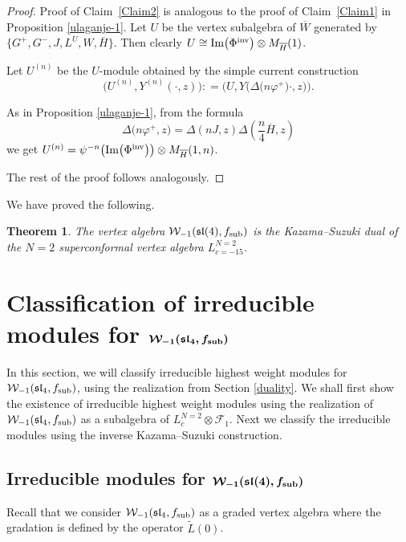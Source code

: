 \documentclass[pdftex]{sigma}
\numberwithin{equation}{section}
\newcommand{\F}{\mathcal F}
\newtheorem{Theorem}{Theorem}[section]
\begin{document}
\begin{proof}
Proof of Claim~\ref{Claim2} is analogous to the proof of Claim~\ref{Claim1} in Proposition \ref{ulaganje-1}. Let $U$ be the vertex subalgebra of $\overline W$ generated by $\big\{ G^+, G^-, J, L^U, W, \overline{H} \big\}$. Then clearly $U \cong \operatorname{Im} \bigl(\Phi^{\rm inv}\bigr) \otimes M_{\overline{H}} (1)$.

Let $ U^{(n)} $ be the $U$-module obtained by the simple current construction
\[ \bigl(U^{(n)}, Y^{(n)} (\cdot, z)\bigr): = \bigl(U , Y\bigl(\Delta\bigl(n \varphi^+\bigr) \cdot, z\bigr)\bigr).
\]

As in Proposition \ref{ulaganje-1}, from the formula
\[%
\Delta\bigl(n\varphi^+, z\bigr) = \Delta( nJ, z) \Delta\left(\frac{n}{4} \overline{H}, z\right)
\]
we get
$U^{(n)}= \psi^{-n}\bigl( \operatorname{Im} \bigl(\Phi^{\rm inv}\bigr)\bigr) \otimes M_{\overline{H}} (1,n )$.


The rest of the proof follows analogously.
\end{proof}

We have proved the following.

\begin{Theorem} The vertex algebra $\mathcal{W}_{-1}(\mathfrak{sl}(4), f_{\rm sub})$ is the Kazama--Suzuki dual of the $N=2$ superconformal vertex algebra $L^{N=2}_{c=-15}$.
\end{Theorem}

\section[Classification of irreducible modules for W\_-1(sl\_4, f\_sub]{Classification of irreducible modules for $\boldsymbol{\mathcal{W}_{-1}(\mathfrak{sl}_4, f_{\rm sub})}$}

 In this section, we will classify irreducible highest weight modules for $\mathcal{W}_{-1}(\mathfrak{sl}_4, f_{\rm sub})$, using the realization from Section \ref{duality}.
 We shall first show the existence of irreducible highest weight modules using the realization of $\mathcal{W}_{-1}(\mathfrak{sl}_4, f_{\rm sub})$ as a subalgebra of $L_c ^{N=2} \otimes \F_1$. Next we classify the irreducible modules using the inverse Kazama--Suzuki construction.

\subsection[Irreducible modules for W\_-1(sl(4), f\_sub]{Irreducible modules for $\boldsymbol{\mathcal{W}_{-1}(\mathfrak{sl}(4), f_{\rm sub})}$}
Recall that we consider $\mathcal{W}_{-1}(\mathfrak{sl}_4, f_{\rm sub})$ as a graded vertex algebra where the gradation is defined by the operator $\widetilde L(0)$.
\end{document}
